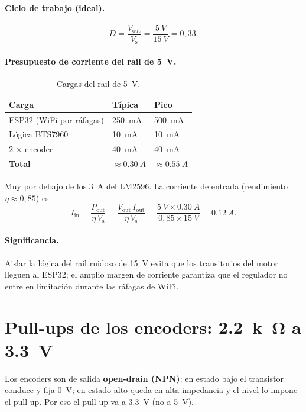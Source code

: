 \documentclass[11pt,letterpaper]{article}
\begin{document}
\paragraph{Ciclo de trabajo (ideal).}
\begin{equation}
  D = \frac{V_\text{out}}{V_\text{s}} = \frac{\SI{5}{V}}{\SI{15}{V}} = 0{,}33.
\end{equation}

\paragraph{Presupuesto de corriente del rail de \SI{5}{V}.}
\begin{table}[H]
  \centering
  \caption{Cargas del rail de \SI{5}{V}.}
  \label{tab:carga5v}
  \begin{tabular}{lll}
    \toprule
    Carga & Típica & Pico \\
    \midrule
    ESP32 (WiFi por ráfagas) & \SI{250}{mA} & \SI{500}{mA} \\
    Lógica BTS7960           & \SI{10}{mA}  & \SI{10}{mA} \\
    2 $\times$ encoder       & \SI{40}{mA}  & \SI{40}{mA} \\
    \midrule
    \textbf{Total}           & $\approx\SI{0.30}{A}$ & $\approx\SI{0.55}{A}$ \\
    \bottomrule
  \end{tabular}
\end{table}
Muy por debajo de los \SI{3}{A} del LM2596. La corriente de entrada (rendimiento
$\eta\approx0{,}85$) es
\begin{equation}
  I_\text{in} = \frac{P_\text{out}}{\eta\,V_\text{s}}
  = \frac{V_\text{out}\,I_\text{out}}{\eta\,V_\text{s}}
  = \frac{\SI{5}{V}\times\SI{0.30}{A}}{0{,}85\times\SI{15}{V}}
  = \SI{0.12}{A}.
\end{equation}

\paragraph{Significancia.} Aislar la lógica del rail ruidoso de \SI{15}{V} evita
que los transitorios del motor lleguen al ESP32; el amplio margen de corriente
garantiza que el regulador no entre en limitación durante las ráfagas de WiFi.

\section{Pull-ups de los encoders: \texorpdfstring{\SI{2.2}{k\ohm}}{2.2 kOhm} a \texorpdfstring{\SI{3.3}{V}}{3.3 V}}
Los encoders son de salida \textbf{open-drain (NPN)}: en estado bajo el transistor
conduce y fija \SI{0}{V}; en estado alto queda en alta impedancia y el nivel lo
impone el pull-up. Por eso el pull-up va a \SI{3.3}{V} (no a \SI{5}{V}).
\end{document}
